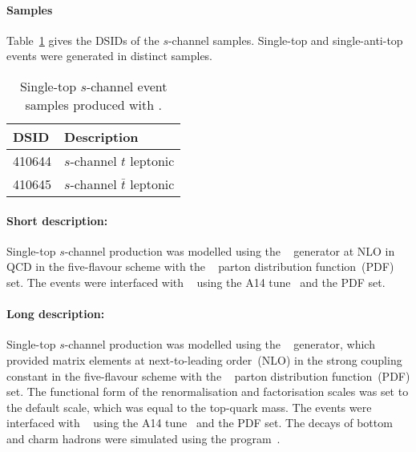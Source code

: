 \paragraph{Samples}

Table~\ref{tab:schan_PP8} gives the DSIDs of the $s$-channel \POWPY[8] samples.
Single-top and single-anti-top events were generated in distinct samples.
\begin{table}[htbp]
\begin{center}
\caption{Single-top $s$-channel event samples produced with \POWPY[8].} 
\label{tab:schan_PP8}
\begin{tabular}{ l | l }
\hline
DSID & Description \\
\hline
410644 & $s$-channel $t$ leptonic \\
410645 & $s$-channel $\bar{t}$ leptonic \\
\hline
\end{tabular}
\end{center}
\end{table}

\paragraph{Short description:}

Single-top $s$-channel production was modelled using the \POWHEGBOX[v2]~\cite{Alioli:2009je,Nason:2004rx,Frixione:2007vw,Alioli:2010xd}
generator at NLO in QCD in the five-flavour scheme with the \NNPDF[3.0nlo]~\cite{Ball:2014uwa} parton distribution function~(PDF) set.
The events were interfaced with \PYTHIA[8.230]~\cite{Sjostrand:2014zea} using the A14 tune~\cite{ATL-PHYS-PUB-2014-021} and the
\NNPDF[2.3lo] PDF set.



\paragraph{Long description:}

Single-top $s$-channel production was modelled using the \POWHEGBOX[v2]~\cite{Alioli:2009je,Nason:2004rx,Frixione:2007vw,Alioli:2010xd}
generator, which provided matrix elements at next-to-leading order~(NLO) in the strong coupling constant \alphas in the 
five-flavour scheme with the \NNPDF[3.0nlo]~\cite{Ball:2014uwa} parton distribution function~(PDF) set.
The functional form of the renormalisation and factorisation scales was set to the default scale, which was equal to the top-quark mass.
The events were interfaced with \PYTHIA[8.230]~\cite{Sjostrand:2014zea} using the A14 tune~\cite{ATL-PHYS-PUB-2014-021} and the
\NNPDF[2.3lo] PDF set.
The decays of bottom and charm hadrons were simulated using the \EVTGEN[1.6.0] program~\cite{Lange:2001uf}.

